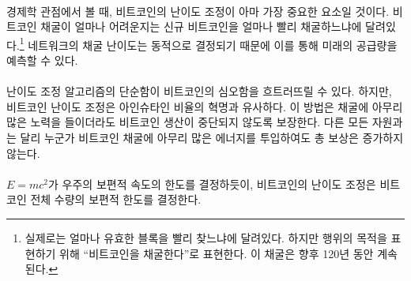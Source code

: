 \paragraph{}
\begin{comment}	
	Viewed through the lens of economics, Bitcoin's \textit{difficulty adjustment}
	is probably its most important component. How hard it is to mine bitcoin depends
	on how quickly new bitcoins are mined.\footnote{It actually depends on how
		quickly valid blocks are found, but for our purposes, this is the same thing as
		\enquote{mining bitcoins} and will be so for the next 120 years.} It is the dynamic
	adjustment of the network's mining difficulty which enables us to predict its
	future supply.
\end{comment}
경제학 관점에서 볼 때, 비트코인의 난이도 조정이 아마 가장 중요한 요소일 것이다.
비트코인 채굴이 얼마나 어려운지는 신규 비트코인을 얼마나 빨리 채굴하느냐에 달려있다.\footnote{실제로는 얼마나 유효한 블록을 빨리 찾느냐에 달려있다. 
	하지만 행위의 목적을 표현하기 위해 \enquote{비트코인을 채굴한다}로 표현한다. 
	이 채굴은 향후 120년 동안 계속된다.}
네트워크의 채굴 난이도는 동적으로 결정되기 때문에 이를 통해 미래의 공급량을 예측할 수 있다.

\paragraph{}
\begin{comment}	
	The simplicity of the difficulty adjustment algorithm might distract
	from its profundity, but the difficulty adjustment truly is a revolution
	of Einsteinian proportions. It ensures that, no matter how much or how
	little effort is spent on mining, Bitcoin's controlled supply won't be
	disrupted. As opposed to every other resource, no matter how much
	energy someone will put into mining bitcoin, the total reward will not
	increase.
\end{comment}
난이도 조정 알고리즘의 단순함이 비트코인의 심오함을 흐트러뜨릴 수 있다. 
하지만, 비트코인 난이도 조정은 아인슈타인 비율의 혁명과 유사하다.
이 방법은 채굴에 아무리 많은 노력을 들이더라도 비트코인 생산이 중단되지 않도록 보장한다.
다른 모든 자원과는 달리 누군가 비트코인 채굴에 아무리 많은 에너지를 투입하여도 총 보상은 증가하지 않는다.

\paragraph{}
\begin{comment}	
	Just like $E=mc^2$ dictates the universal speed limit in our universe,
	Bitcoin's difficulty adjustment dictates the \textbf{universal money limit}
	in Bitcoin.
\end{comment}
$E=mc^2$가 우주의 보편적 속도의 한도를 결정하듯이, 
비트코인의 난이도 조정은 비트코인 전체 수량의 보편적 한도를 결정한다.

